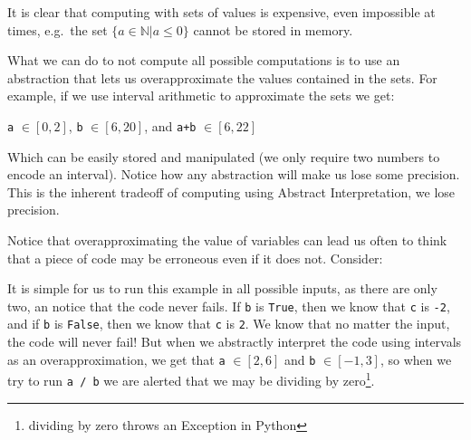 It is clear that computing with sets of values is expensive, even
impossible at times, e.g.~the set \(\{a \in \mathbb{N} | a \leq 0\}\)
cannot be stored in memory.

What we can do to not compute all possible computations is to use an
abstraction that lets us overapproximate the values contained in the
sets. For example, if we use interval arithmetic to approximate the sets
we get:

\texttt{a} \(\in \left[0, 2\right]\), \texttt{b}
\(\in \left[6, 20\right]\), and \texttt{a+b} \(\in \left[6, 22\right]\)

Which can be easily stored and manipulated (we only require two numbers
to encode an interval). Notice how any abstraction will make us lose
some precision. This is the inherent tradeoff of computing using
Abstract Interpretation, we lose precision.

Notice that overapproximating the value of variables can lead us often
to think that a piece of code may be erroneous even if it does not.
Consider:

\begin{Shaded}
\begin{Highlighting}[]
\OperatorTok{=} \NormalTok{(}\NormalTok{())}

\OperatorTok{=} 
\OperatorTok{=} 
\NormalTok{:}
\OperatorTok{=} 
\OperatorTok{=} 

\OperatorTok{=}\OperatorTok{/}
\end{Highlighting}
\end{Shaded}

It is simple for us to run this example in all possible inputs, as there
are only two, an notice that the code never fails. If \texttt{b} is
\texttt{True}, then we know that \texttt{c} is \texttt{-2}, and if
\texttt{b} is \texttt{False}, then we know that \texttt{c} is
\texttt{2}. We know that no matter the input, the code will never fail!
But when we abstractly interpret the code using intervals as an
overapproximation, we get that \texttt{a} \(\in [2,6]\) and \texttt{b}
\(\in [-1,3]\), so when we try to run \texttt{a\ /\ b} we are alerted
that we may be dividing by zero\footnote{dividing by zero throws an
  Exception in Python}.

